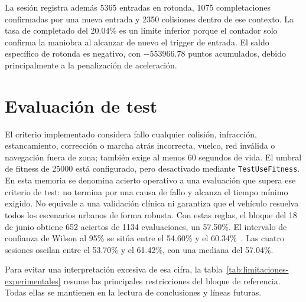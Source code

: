 La sesión registra además 5365 entradas en rotonda, 1075 completaciones confirmadas por una nueva entrada y 2350 colisiones dentro de ese contexto. La tasa de completado del 20.04\% es un límite inferior porque el contador solo confirma la maniobra al alcanzar de nuevo el trigger de entrada. El saldo específico de rotonda es negativo, con \(-553966.78\) puntos acumulados, debido principalmente a la penalización de aceleración.

\section{Evaluación de test}

El criterio implementado considera fallo cualquier colisión, infracción, estancamiento, corrección o marcha atrás incorrecta, vuelco, red inválida o navegación fuera de zona; también exige al menos 60 segundos de vida. El umbral de fitness de 25000 está configurado, pero desactivado mediante \texttt{TestUseFitness}. En esta memoria se denomina acierto operativo a una evaluación que supera ese criterio de test: no termina por una causa de fallo y alcanza el tiempo mínimo exigido. No equivale a una validación clínica ni garantiza que el vehículo resuelva todos los escenarios urbanos de forma robusta. Con estas reglas, el bloque del 18 de junio obtiene 652 aciertos de 1134 evaluaciones, un 57.50\%. El intervalo de confianza de Wilson al 95\% se sitúa entre el 54.60\% y el 60.34\%~\cite{wilson}. Las cuatro sesiones oscilan entre el 53.70\% y el 61.42\%, con una mediana del 57.04\%.

Para evitar una interpretación excesiva de esa cifra, la tabla~\ref{tab:limitaciones-experimentales} resume las principales restricciones del bloque de referencia. Todas ellas se mantienen en la lectura de conclusiones y líneas futuras.

